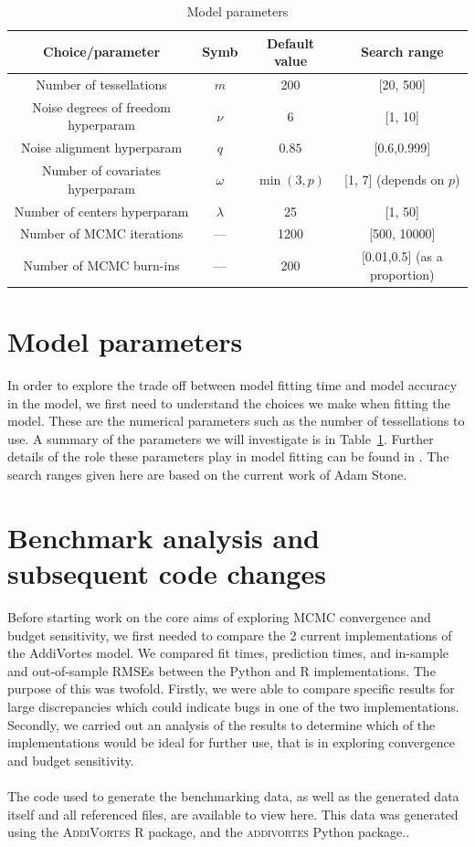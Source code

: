 \documentclass[10pt]{article}
\begin{document}
\begin{table}[!b]
\centering
\begin{tabular}{ |c|c|c|c| }
\hline
\textbf{Choice/parameter} & \textbf{Symb} & \textbf{Default value} & \textbf{Search range} \\
\hline
Number of tessellations & $m$ & 200 & [20, 500]\\
\hline
Noise degrees of freedom hyperparam & $\nu$ & $6$ & [1, 10]\\
Noise alignment hyperparam & $q$ & $0.85$ & [0.6,0.999]\\
\hline
Number of covariates hyperparam & $\omega$ & $\min(3, p)$ & [1, 7] (depends on $p$) \\
Number of centers hyperparam & $\lambda$  & 25 & [1, 50] \\
\hline
Number of MCMC iterations & --- & 1200 & [500, 10000] \\
Number of MCMC burn-ins & --- & 200 & [0.01,0.5] (as a proportion)\\
\hline
\end{tabular}
\caption{Model parameters}
\label{tab:model-parameters}
\end{table}
\section{Model parameters}
In order to explore the trade off between model fitting time and model accuracy in the model, we first need to understand the choices we make when fitting the model. These are the numerical parameters such as the number of tessellations to use. A summary of the parameters we will investigate is in Table~\ref{tab:model-parameters}. Further details of the role these parameters play in model fitting can be found in \cite{main-paper}. The search ranges given here are based on the current work of Adam Stone.
\section{Benchmark analysis and subsequent code changes}
Before starting work on the core aims of exploring MCMC convergence and budget sensitivity, we first needed to compare the 2 current implementations of the AddiVortes model. We compared fit times, prediction times, and in-sample and out-of-sample RMSEs between the Python and R implementations. The purpose of this was twofold. Firstly, we were able to compare specific results for large discrepancies which could indicate bugs in one of the two implementations. Secondly, we carried out an analysis of the results to determine which of the implementations would be ideal for further use, that is in exploring convergence and budget sensitivity.
\\\\
The code used to generate the benchmarking data, as well as the generated data itself and all referenced files, are available to view here\cite{repo}. This data was generated using the \textsc{AddiVortes} R package\cite{r-repo}, and the \textsc{addivortes} Python package.\cite{py-repo}.
\end{document}
